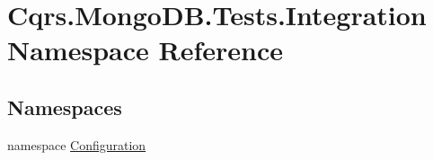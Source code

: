 \hypertarget{namespaceCqrs_1_1MongoDB_1_1Tests_1_1Integration}{}\section{Cqrs.\+Mongo\+D\+B.\+Tests.\+Integration Namespace Reference}
\label{namespaceCqrs_1_1MongoDB_1_1Tests_1_1Integration}
\subsection*{Namespaces}
\begin{DoxyCompactItemize}
\item 
namespace \hyperlink{namespaceCqrs_1_1MongoDB_1_1Tests_1_1Integration_1_1Configuration}{Configuration}
\end{DoxyCompactItemize}
